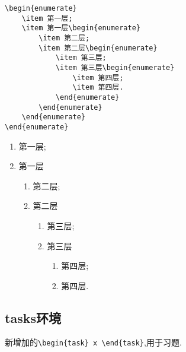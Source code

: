 \documentclass[lang=cn,12pt,scheme=chinese,mode=simple,black]{elegantbook}
\begin{document}
\begin{lstlisting}
\begin{enumerate}
    \item 第一层;
    \item 第一层\begin{enumerate}
        \item 第二层;
        \item 第二层\begin{enumerate}
            \item 第三层;
            \item 第三层\begin{enumerate}
                \item 第四层;
                \item 第四层.
            \end{enumerate}
        \end{enumerate}
    \end{enumerate}
\end{enumerate}
\end{lstlisting}

\begin{resultbox}
\begin{enumerate}
    \item 第一层;
    \item 第一层\begin{enumerate}
        \item 第二层;
        \item 第二层\begin{enumerate}
            \item 第三层;
            \item 第三层\begin{enumerate}
                \item 第四层;
                \item 第四层.
            \end{enumerate}
        \end{enumerate}
    \end{enumerate}
\end{enumerate}
\end{resultbox}

\subsection{tasks环境}
新增加的\verb|\begin{task} x \end{task}|,用于习题.
\end{document}
